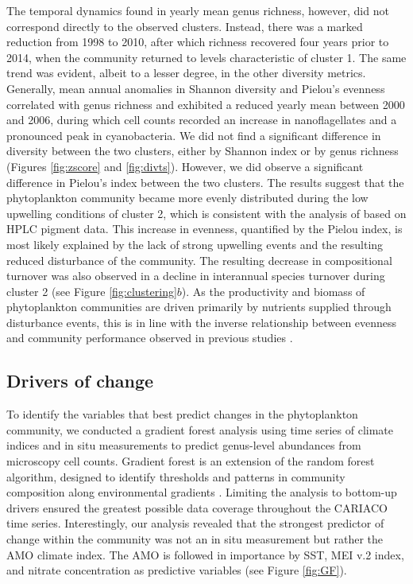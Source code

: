 \documentclass[draft]{agujournal2019}
\begin{document}
    
    The temporal dynamics found in yearly mean genus richness, however, did not correspond directly to the observed clusters. Instead, there was a marked reduction from 1998 to 2010, after which richness recovered four years prior to 2014, when the community returned to levels characteristic of cluster 1. The same trend was evident, albeit to a lesser degree, in the other diversity metrics. Generally, mean annual anomalies in Shannon diversity and Pielou's evenness correlated with genus richness and exhibited a reduced yearly mean between 2000 and 2006, during which cell counts recorded an increase in nanoflagellates and a pronounced peak in cyanobacteria.
    We did not find a significant difference in diversity between the two clusters, either by Shannon index or by genus richness (Figures \ref{fig:zscore} and \ref{fig:divts}). However, we did observe a significant difference in Pielou's index between the two clusters. The results suggest that the phytoplankton community became more evenly distributed during the low upwelling conditions of cluster 2, which is consistent with the analysis of  based on HPLC pigment data. This increase in evenness, quantified by the Pielou index, is most likely explained by the lack of strong upwelling events and the resulting reduced disturbance of the community. The resulting decrease in compositional turnover was also observed in a decline in interannual species turnover during cluster 2 (see Figure \ref{fig:clustering}$b$). As the productivity and biomass of phytoplankton communities are driven primarily by nutrients supplied through disturbance events, this is in line with the inverse relationship between evenness and community performance observed in previous studies \cite{lehtinen_phytoplankton_2017, otero_phytoplankton_2020}.
    
    

\subsection{Drivers of change}
    To identify the variables that best predict changes in the phytoplankton community, we conducted a gradient forest analysis using time series of climate indices and in situ measurements to predict genus-level abundances from microscopy cell counts. Gradient forest is an extension of the random forest algorithm, designed to identify thresholds and patterns in community composition along environmental gradients \cite{ellis_gradient_2012}. Limiting the analysis to bottom-up drivers ensured the greatest possible data coverage throughout the CARIACO time series. Interestingly, our analysis revealed that the strongest predictor of change within the community was not an in situ measurement but rather the AMO climate index. The AMO is followed in importance by SST, MEI v.2 index, and nitrate concentration as predictive variables (see Figure \ref{fig:GF}).
    
\end{document}
